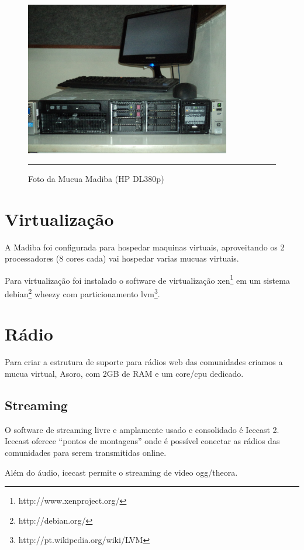 \documentclass[a4paper, 11pt, oneside]{Relatorio_sem_2}  %
\begin{document}
\begin{figure}[htbp]
  \centering
  \includegraphics[width=0.8\textwidth]{./Fig/DL380P_2.pdf}
  \rule{35em}{0.5pt}
  \caption[Foto da Mucua Madiba (HP DL380p)]{Foto da Mucua Madiba (HP DL380p)}
  \label{fig:MucuaMadiba2}
\end{figure}

\section{Virtualização}
A Madiba foi configurada para hospedar maquinas virtuais, aproveitando
os 2 processadores (8 cores cada) vai hospedar varias mucuas virtuais. 

Para virtualização foi instalado o software de virtualização
xen\footnote{http://www.xenproject.org/} em um sistema
debian\footnote{http://debian.org/} wheezy com particionamento
lvm\footnote{http://pt.wikipedia.org/wiki/LVM}.

\section{Rádio}
Para criar a estrutura de suporte para rádios web das comunidades
criamos a mucua virtual, Asoro, com 2GB de RAM e um core/cpu dedicado.

\subsection{Streaming}
O software de streaming livre e amplamente usado e consolidado é
Icecast 2. Icecast oferece ``pontos de montagens'' onde é possível
conectar as rádios das comunidades para serem transmitidas online.

Além do áudio, icecast permite o streaming de video ogg/theora. 
\end{document}
